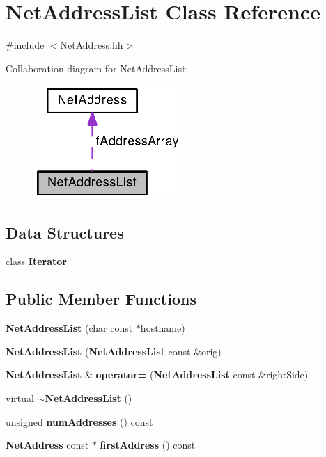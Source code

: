 \section{Net\+Address\+List Class Reference}
\label{classNetAddressList}


{\ttfamily \#include $<$Net\+Address.\+hh$>$}



Collaboration diagram for Net\+Address\+List\+:
\nopagebreak
\begin{figure}[H]
\begin{center}
\leavevmode
\includegraphics[width=160pt]{classNetAddressList__coll__graph}
\end{center}
\end{figure}
\subsection*{Data Structures}
\begin{DoxyCompactItemize}
\item 
class {\bf Iterator}
\end{DoxyCompactItemize}
\subsection*{Public Member Functions}
\begin{DoxyCompactItemize}
\item 
{\bf Net\+Address\+List} (char const $\ast$hostname)
\item 
{\bf Net\+Address\+List} ({\bf Net\+Address\+List} const \&orig)
\item 
{\bf Net\+Address\+List} \& {\bf operator=} ({\bf Net\+Address\+List} const \&right\+Side)
\item 
virtual {\bf $\sim$\+Net\+Address\+List} ()
\item 
unsigned {\bf num\+Addresses} () const 
\item 
{\bf Net\+Address} const $\ast$ {\bf first\+Address} () const 
\end{DoxyCompactItemize}
